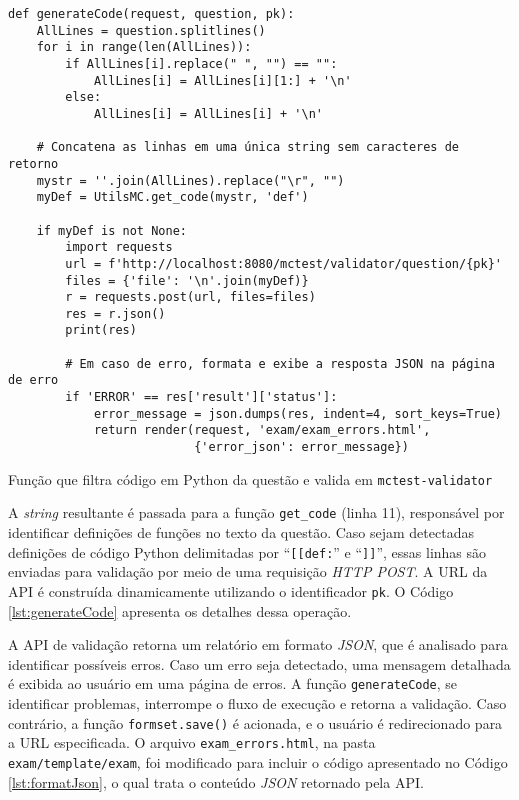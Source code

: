 \begin{listing}[!ht]
\begin{verbatim}
def generateCode(request, question, pk):
    AllLines = question.splitlines()
    for i in range(len(AllLines)):
        if AllLines[i].replace(" ", "") == "":
            AllLines[i] = AllLines[i][1:] + '\n'
        else:
            AllLines[i] = AllLines[i] + '\n'

    # Concatena as linhas em uma única string sem caracteres de retorno
    mystr = ''.join(AllLines).replace("\r", "")
    myDef = UtilsMC.get_code(mystr, 'def')

    if myDef is not None:
        import requests
        url = f'http://localhost:8080/mctest/validator/question/{pk}'
        files = {'file': '\n'.join(myDef)}
        r = requests.post(url, files=files)
        res = r.json()
        print(res)

        # Em caso de erro, formata e exibe a resposta JSON na página de erro
        if 'ERROR' == res['result']['status']:
            error_message = json.dumps(res, indent=4, sort_keys=True)
            return render(request, 'exam/exam_errors.html', 
                          {'error_json': error_message})
\end{verbatim}
\caption{Função que filtra código em Python da questão e valida em \texttt{mctest-validator}}
\label{lst:generateCode}
\end{listing}

A \textit{string} resultante é passada para a função \texttt{get\_code} (linha 11), responsável por identificar definições de funções no texto da questão. Caso sejam detectadas definições de código Python delimitadas por ``\texttt{[[def:}'' e ``\texttt{]]}'', essas linhas são enviadas para validação por meio de uma requisição \textit{HTTP POST}. A URL da API é construída dinamicamente utilizando o identificador \texttt{pk}. O Código \ref{lst:generateCode} apresenta os detalhes dessa operação.

A API de validação retorna um relatório em formato \textit{JSON}, que é analisado para identificar possíveis erros. Caso um erro seja detectado, uma mensagem detalhada é exibida ao usuário em uma página de erros. A função \texttt{generateCode}, se identificar problemas, interrompe o fluxo de execução e retorna a validação. Caso contrário, a função \texttt{formset.save()} é acionada, e o usuário é redirecionado para a URL especificada. O arquivo \texttt{exam\_errors.html}, na pasta \texttt{exam/template/exam}, foi modificado para incluir o código apresentado no Código \ref{lst:formatJson}, o qual trata o conteúdo \textit{JSON} retornado pela API.

